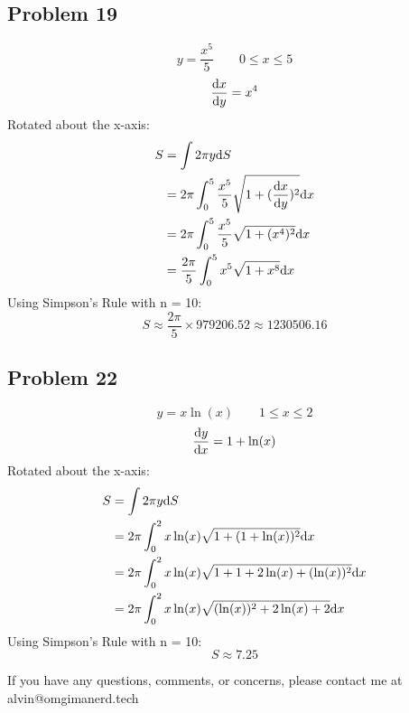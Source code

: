 \documentclass[letterpaper, 12pt]{math}
\begin{document}
\subsection*{Problem 19}
\[ y = \frac{x^{5}}{5} \quad \quad 0 \leq x \leq 5 \]
\[ \frac{\mathrm{d}{x}}{\mathrm{d}{y}} = x^{4} \]
Rotated about the x-axis:
\begin{align*}
  S &= \int{2\pi y\mathrm{d}{S}} \\
  &= 2\pi\int_{0}^{5}{
    \frac{x^{5}}{5}\sqrt{1+(\frac{\mathrm{d}{x}}{\mathrm{d}{y}})^{2}}\mathrm{d}{x}} \\
  &= 2\pi\int_{0}^{5}{\frac{x^{5}}{5}\sqrt{1+(x^{4})^{2}}\mathrm{d}{x}} \\
  &= \frac{2\pi}{5}\int_{0}^{5}{x^{5}\sqrt{1+x^{8}}\mathrm{d}{x}} \\
\end{align*}
Using Simpson's Rule with n = 10:
\[ S \approx \frac{2\pi}{5} \times 979206.52 \approx 1230506.16 \]

\subsection*{Problem 22}
\[ y = x\ln(x) \quad \quad 1 \leq x \leq 2 \]
\[ \frac{\mathrm{d}{y}}{\mathrm{d}{x}} = 1+\ln(x) \]
Rotated about the x-axis:
\begin{align*}
  S &= \int{2\pi y\mathrm{d}{S}} \\
  &= 2\pi\int_{0}^{2}{x\ln(x)\sqrt{1+(1+\ln(x))^{2}}\mathrm{d}{x}} \\
  &= 2\pi\int_{0}^{2}{x\ln(x)\sqrt{1+1+2\ln(x)+(\ln(x))^{2}}\mathrm{d}{x}} \\
  &= 2\pi\int_{0}^{2}{x\ln(x)\sqrt{(\ln(x))^{2}+2\ln(x)+2}\mathrm{d}{x}}
\end{align*}
Using Simpson's Rule with n = 10:
\[ S \approx 7.25 \]

\begin{center}
  If you have any questions, comments, or concerns, please contact me at
  alvin@omgimanerd.tech
\end{center}
\end{document}
